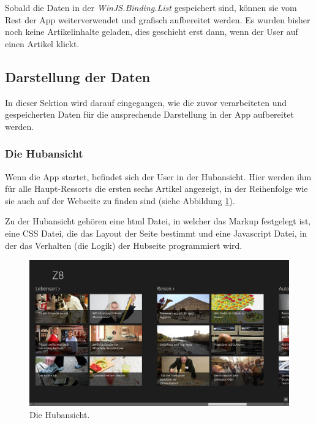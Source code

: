 \documentclass[12pt,a4paper,bibtotoc,abstracton]{scrartcl}
\begin{document}
\begin{minipage}{\linewidth}
  
\end{minipage}

Sobald die Daten in der \textit{WinJS.Binding.List} gespeichert sind, können sie vom Rest der App weiterverwendet und grafisch aufbereitet werden. Es wurden bisher noch keine Artikelinhalte geladen, dies geschieht erst dann, wenn der User auf einen Artikel klickt.

\subsection{Darstellung der Daten}
\label{subsec:darstellungderdaten}
In dieser Sektion wird darauf eingegangen, wie die zuvor verarbeiteten und gespeicherten Daten für die ansprechende Darstellung in der App aufbereitet werden.

\subsubsection{Die Hubansicht}
\label{subsubsec:hubansicht}
Wenn die App startet, befindet sich der User in der Hubansicht. Hier werden ihm für alle Haupt-Ressorts die ersten sechs Artikel angezeigt, in der Reihenfolge wie sie auch auf der Webseite zu finden sind (siehe Abbildung \ref{fig:hubressortübersicht}).

Zu der Hubansicht gehören eine \ac{html} Datei, in welcher das Markup festgelegt ist, eine CSS Datei, die das Layout der Seite bestimmt und eine Javascript Datei, in der das Verhalten (die Logik) der Hubseite programmiert wird. 

\begin{figure}[h]
	\centering
	\includegraphics[width=\textwidth]{Bilder/Screenshots/app/reise_aegypten_2gmit.png} 
	\caption{Die Hubansicht.}
	\label{fig:hubressortübersicht}
\end{figure}
\end{document}
